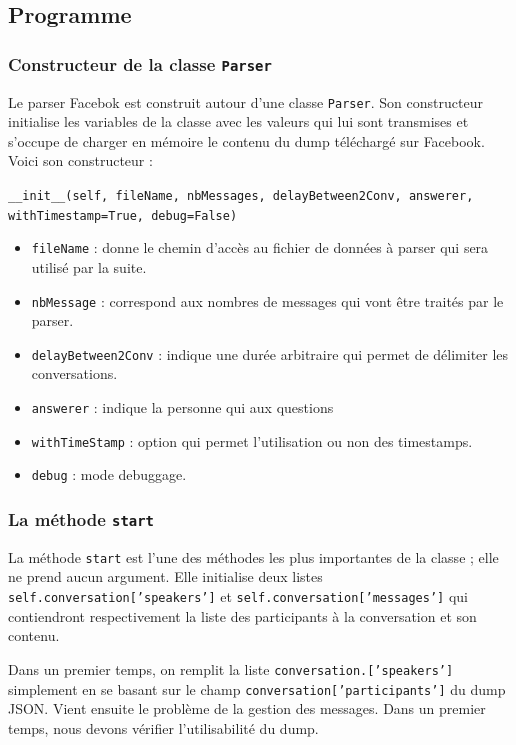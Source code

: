 \documentclass[10pt,a4paper]{article}
\begin{document}
\subsection{Programme}
\subsubsection{Constructeur de la classe \texttt{Parser}}
Le parser Facebok est construit autour d'une classe \texttt{Parser}. Son constructeur initialise les variables de la classe avec les valeurs qui lui sont transmises et s'occupe de charger en mémoire le contenu du dump téléchargé sur Facebook.  Voici son constructeur :
\begin{center}
	\texttt{\_\_init\_\_(self, fileName, nbMessages, delayBetween2Conv, answerer, withTimestamp=True, debug=False)}
\end{center}


\begin{itemize}
	\item \texttt{fileName} : donne le chemin d'accès au fichier de données à parser qui sera utilisé par la suite.
	\item \texttt{nbMessage} : correspond aux nombres de messages qui vont être traités par le parser.
	\item \texttt{delayBetween2Conv} : indique une durée arbitraire qui permet de délimiter les conversations.
	\item \texttt{answerer} : indique la personne qui aux questions
	\item \texttt{withTimeStamp} : option qui permet l'utilisation ou non des timestamps.
	\item \texttt{debug} : mode debuggage.
\end{itemize}

\subsubsection{La méthode \texttt{start}}
La méthode \texttt{start} est l'une des méthodes les plus importantes de la classe ; elle ne prend aucun argument. Elle initialise deux listes \texttt{self.conversation['speakers']} et \texttt{self.conversation['messages']} qui contiendront respectivement la liste des participants à la conversation et son contenu.

Dans un premier temps, on remplit la liste \texttt{conversation.['speakers']} simplement en se basant sur le champ \texttt{conversation['participants']} du dump JSON. Vient ensuite le problème de la gestion des messages. Dans un premier temps, nous devons vérifier l'utilisabilité du dump.
\end{document}
